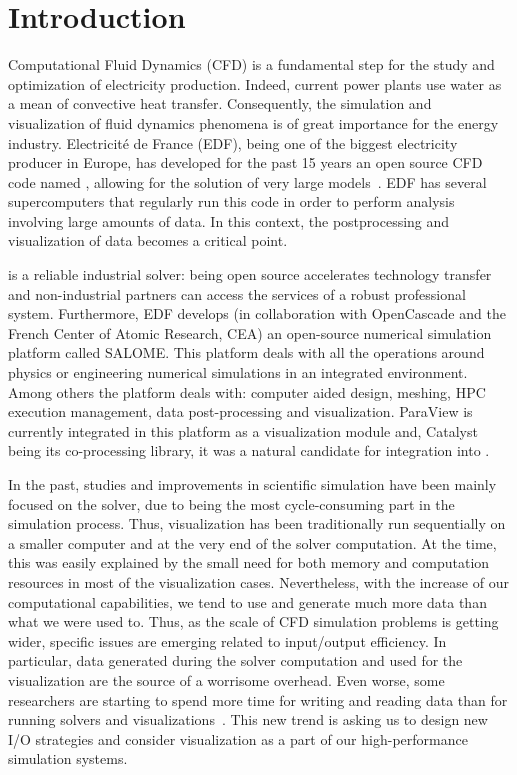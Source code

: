 \section{Introduction}
Computational Fluid Dynamics (CFD) is a fundamental step for the study and
optimization of electricity production. Indeed, current power plants use water
as a mean of convective heat transfer.  Consequently, the simulation and
visualization of fluid dynamics phenomena is of great importance for the energy
industry. Electricité de France (EDF), being one of the biggest electricity producer in Europe, has
developed for the past 15 years an open source CFD code named \CS,
allowing for the solution of very large models~\cite{5644955}. EDF has
several supercomputers that regularly run this code in order to perform
analysis involving large amounts of data. In this context, the postprocessing
and visualization of data becomes a critical point. 

\CS is a reliable industrial solver: being open source accelerates
technology transfer and non-industrial partners can access the services of a
robust professional system. Furthermore, EDF develops (in collaboration with
OpenCascade and the French Center of Atomic Research, CEA) an open-source
numerical simulation platform called SALOME. This platform deals with all the
operations around physics or engineering numerical simulations in an integrated
environment. Among others the platform deals with: computer aided design,
meshing, HPC execution management, data post-processing and visualization.
ParaView is currently integrated in this platform as a visualization module and,
Catalyst being its co-processing library, it was a natural candidate for
integration into \CS.

In the past, studies and improvements in scientific simulation have been mainly
focused on the solver, due to being the most cycle-consuming part in the
simulation process. Thus, visualization has been traditionally run sequentially
on a smaller computer and at the very end of the solver computation. At the
time, this was easily explained by the small need for both memory and
computation resources in most of the visualization cases. Nevertheless, with the
increase of our computational capabilities, we tend to use and generate much
more data than what we were used to. Thus, as the scale of CFD simulation
problems is getting wider, specific issues are emerging related to input/output
efficiency. In particular, data generated during the solver computation and
used for the visualization are the source of a worrisome overhead. Even worse,
some researchers are starting to spend more time for writing and reading data
than for running solvers and visualizations~\cite{1742-6596-125-1-012099}.
This new trend is asking us to design new I/O strategies and consider
visualization as a part of our high-performance simulation systems.



